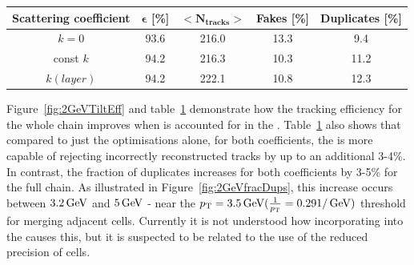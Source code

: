 \begin{table}[htbp]
\label{tab:trackFindingPerformance2GeVKF}
\centering
\begin{tabular}{ccccc}
   \hline
   \bf{Scattering coefficient} & \bf{$\bm{\epsilon}$ [\%]} & $\bm{<N_{tracks}>}$ & \bf{Fakes [\%]} & \bf{Duplicates [\%]}  \\
   \hline
   $k = 0$  & 93.6 & 216.0 & 13.3 & 9.4 \\      
   \hline
   const $k$ & 94.2 & 216.3 & 10.3 & 11.2 \\      
   \hline
    $k(layer)$ & 94.2 & 222.1 & 10.8 & 12.3 \\  
   \hline
   
\end{tabular}%
\end{table}

Figure~\ref{fig:2GeVTiltEff} and table~\ref{tab:trackFindingPerformance2GeVKF} demonstrate how the tracking efficiency for the whole chain improves when \MS is accounted for in the \KF.
Table~\ref{tab:trackFindingPerformance2GeVKF} also shows that compared to just the \HT optimisations alone, for both \MS coefficients, the \KF is more capable of rejecting incorrectly reconstructed tracks by up to an additional 3-4\%.
In contrast, the fraction of duplicates increases for both coefficients by 3-5\% for the full chain.
As illustrated in Figure~\ref{fig:2GeVfracDups}, this increase occurs between $3.2\,\text{Ge\hspace{-.08em}V}$ and $5\,\text{Ge\hspace{-.08em}V}$ - near the $p_{\mathrm{T}} = 3.5\,\text{Ge\hspace{-.08em}V} (\frac{1}{p_{\mathrm{T}}} = 0.29 1/\,\text{Ge\hspace{-.08em}V})$ threshold for merging adjacent \HT cells.
Currently it is not understood how incorporating \MS into the \KF causes this, but it is suspected to be related to the use of the reduced precision of \HT cells.

